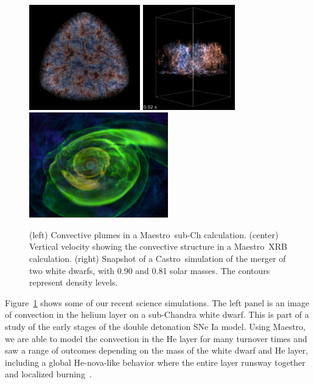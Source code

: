 \documentclass[letterpaper]{jpconf}
\newcommand{\maestro}{{\sffamily Maestro}}
\newcommand{\castro}{{\sffamily Castro}}
\begin{document}
\begin{figure}[t]
\centering \includegraphics[height=1.8in]{subch_h}
\includegraphics[height=1.8in]{xrb_compact}
\includegraphics[height=1.8in]{wdmerger_08030_new}
\caption{\label{fig:current-runs} (left) Convective plumes in a
  \maestro\ sub-Ch calculation. (center) Vertical velocity showing the
  convective structure in a \maestro\ XRB calculation. (right)
  Snapshot of a \castro\ simulation of the merger of two white dwarfs,
  with 0.90 and 0.81 solar masses. The contours represent density
  levels.}
\end{figure}

Figure~\ref{fig:current-runs} shows some of our recent science
simulations.  The left panel is an image of convection in the helium
layer on a sub-Chandra white dwarf.  This is part of a study of the
early stages of the double detonation SNe Ia model.  Using \maestro,
we are able to model the convection in the He layer for many turnover
times and saw a range of outcomes depending on the mass of the white
dwarf and He layer, including a global He-nova-like behavior where the
entire layer runsway together and localized
burning~\cite{subchandra2}.
\end{document}
